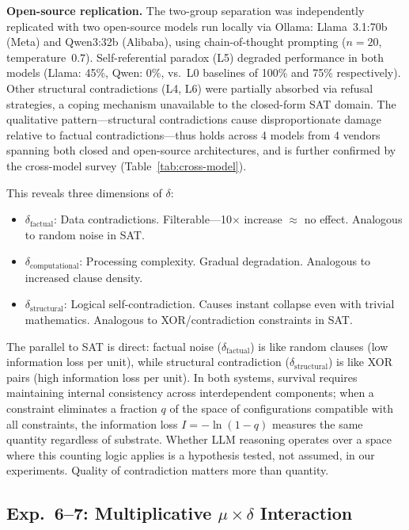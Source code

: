 \documentclass[11pt,a4paper]{article}
\begin{document}
\textbf{Open-source replication.}
The two-group separation was independently replicated with two open-source models run locally via Ollama: Llama~3.1:70b (Meta) and Qwen3:32b (Alibaba), using chain-of-thought prompting ($n = 20$, temperature~$0.7$). Self-referential paradox (L5) degraded performance in both models (Llama: 45\%, Qwen: 0\%, vs.\ L0 baselines of 100\% and 75\% respectively). Other structural contradictions (L4, L6) were partially absorbed via refusal strategies, a coping mechanism unavailable to the closed-form SAT domain. The qualitative pattern---structural contradictions cause disproportionate damage relative to factual contradictions---thus holds across 4 models from 4 vendors spanning both closed and open-source architectures, and is further confirmed by the cross-model survey (Table~\ref{tab:cross-model}).

This reveals three dimensions of $\delta$:
\begin{itemize}
    \item $\delta_{\text{factual}}$: Data contradictions. Filterable---10$\times$ increase $\approx$ no effect. Analogous to random noise in SAT.
    \item $\delta_{\text{computational}}$: Processing complexity. Gradual degradation. Analogous to increased clause density.
    \item $\delta_{\text{structural}}$: Logical self-contradiction. Causes instant collapse even with trivial mathematics. Analogous to XOR/contradiction constraints in SAT.
\end{itemize}

The parallel to SAT is direct: factual noise ($\delta_{\text{factual}}$) is like random clauses (low information loss per unit), while structural contradiction ($\delta_{\text{structural}}$) is like XOR pairs (high information loss per unit). In both systems, survival requires maintaining internal consistency across interdependent components; when a constraint eliminates a fraction $q$ of the space of configurations compatible with all constraints, the information loss $I = -\ln(1-q)$ measures the same quantity regardless of substrate. Whether LLM reasoning operates over a space where this counting logic applies is a hypothesis tested, not assumed, in our experiments. Quality of contradiction matters more than quantity.

\subsection{Exp.~6--7: Multiplicative \texorpdfstring{$\mu \times \delta$}{μ×δ} Interaction}
\end{document}

